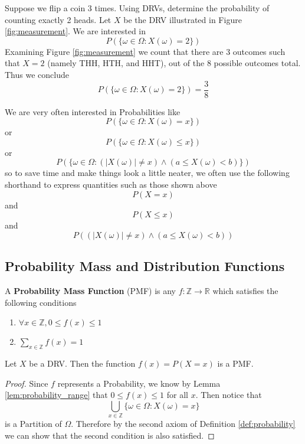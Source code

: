 \begin{example}
    Suppose we flip a coin 3 times. Using DRVs, determine the probability of counting exactly 2 heads.
    \solution
    Let $X$ be the DRV illustrated in Figure \ref{fig:measurement}. We are interested in
    \[
        P\left(\{\omega\in\Omega: X(\omega) = 2\}\right)
    \]
    Examining Figure \ref{fig:measurement} we count that there are 3 outcomes such that $X=2$ (namely THH, HTH, and HHT), out of the 8 possible outcomes total. Thus we conclude
    \[
        P\left(\{\omega\in\Omega: X(\omega) = 2\}\right)=\frac 3 8
    \]
\end{example}
We are very often interested in Probabilities like
\[
    P(\{\omega\in\Omega: X(\omega) = x\})
\]
or
\[
    P(\{\omega\in\Omega: X(\omega) \le x\})
\]
or
\[
    P(\{\omega\in\Omega: (|X(\omega)| \ne x) \land (a \le X(\omega) < b)\})
\]
so to save time and make things look a little neater, we often use the following shorthand to express quantities such as those shown above
\[
    P(X=x)
\]
and
\[
    P(X\le x)
\]
and
\[
    P((|X(\omega)| \ne x) \land (a \le X(\omega) < b))
\]
\subsection{Probability Mass and Distribution Functions}
\begin{definition}
    A \textbf{Probability Mass Function} (PMF) is any $f:\mathbb Z\to \mathbb R$ which satisfies the following conditions
    \begin{enumerate}
        \item $\forall x\in\mathbb Z, 0\le f(x) \le 1$
        \item $\displaystyle\sum_{x\in\mathbb Z} f(x)= 1$
    \end{enumerate}
\end{definition}
\begin{theorem}
    Let $X$ be a DRV. Then the function $f(x)=P(X=x)$ is a PMF.
    \begin{proof}
        Since $f$ represents a Probability, we know by Lemma \ref{lem:probability_range} that $0\le f(x)\le 1$ for all $x$. Then notice that
        \[
            \bigcup_{x\in\mathbb Z}\{\omega\in\Omega : X(\omega)=x\}
        \]
        is a Partition of $\Omega$. Therefore by the second axiom of Definition \ref{def:probability} we can show that the second condition is also satisfied.
    \end{proof}
\end{theorem}


